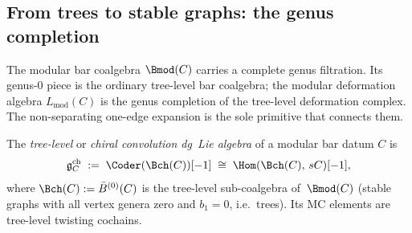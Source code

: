 \subsection{From trees to stable graphs: the genus completion}
\label{subsec:genus-completion}

The modular bar coalgebra $\Bmod(C)$ carries a complete
genus filtration. Its genus-$0$ piece is the ordinary
tree-level bar coalgebra; the modular deformation algebra
$L_{\mathrm{mod}}(C)$ is the genus completion of the
tree-level deformation complex. The non-separating one-edge
expansion is the sole primitive that connects them.

\begin{definition}
\label{def:chiral-convolution}
The \emph{tree-level} or \emph{chiral convolution dg~Lie algebra}
of a modular bar datum $C$ is
\begin{equation}\label{eq:chiral-convolution-dg-lie}
\mathfrak{g}^{\mathrm{ch}}_C
\;:=\;
\Coder(\Bch(C))[-1]
\;\cong\;
\Hom(\Bch(C),\, sC)[-1],
\end{equation}
where $\Bch(C) := \bar{B}^{(0)}(C)$ is the tree-level
sub-coalgebra of~$\Bmod(C)$ (stable graphs with all vertex
genera zero and $b_1 = 0$, i.e.\ trees). Its MC elements are
tree-level twisting cochains.
\end{definition}

